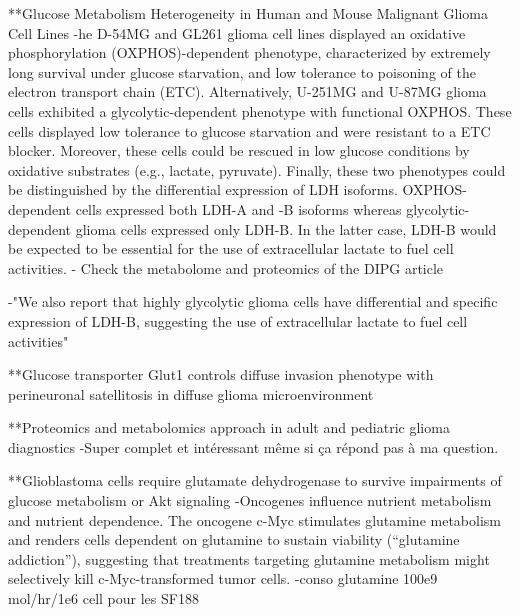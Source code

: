 \documentclass[11pt,a4paper]{article}
\begin{document}
**Glucose Metabolism Heterogeneity in Human and Mouse Malignant Glioma Cell Lines
-he D-54MG and GL261 glioma cell lines displayed an oxidative phosphorylation (OXPHOS)-dependent phenotype, characterized by extremely long survival under glucose starvation, and low tolerance to poisoning of the electron transport chain (ETC). Alternatively, U-251MG and U-87MG glioma cells exhibited a glycolytic-dependent phenotype with functional OXPHOS. These cells displayed low tolerance to glucose starvation and were resistant to a ETC blocker. Moreover, these cells could be rescued in low glucose conditions by oxidative substrates (e.g., lactate, pyruvate). Finally, these two phenotypes could be distinguished by the differential expression of LDH isoforms. OXPHOS-dependent cells expressed both LDH-A and -B isoforms whereas glycolytic-dependent glioma cells expressed only LDH-B. In the latter case, LDH-B would be expected to be essential for the use of extracellular lactate to fuel cell activities. 
- Check the metabolome and proteomics of the DIPG article

-"We also report that highly glycolytic glioma cells have differential and specific expression of LDH-B, suggesting the use of extracellular lactate to fuel cell activities"



**Glucose transporter Glut1 controls diffuse invasion phenotype with perineuronal satellitosis in diffuse glioma microenvironment


**Proteomics and metabolomics approach in adult and pediatric glioma diagnostics 
-Super complet et intéressant même si ça répond pas à ma question.

**Glioblastoma cells require glutamate dehydrogenase to survive impairments of glucose metabolism or Akt signaling
-Oncogenes influence nutrient metabolism and nutrient dependence. The oncogene c-Myc stimulates glutamine metabolism and renders cells dependent on glutamine to sustain viability (“glutamine addiction”), suggesting that treatments targeting glutamine metabolism might selectively kill c-Myc-transformed tumor cells.
-conso glutamine 100e9 mol/hr/1e6 cell pour les SF188
\end{document}

